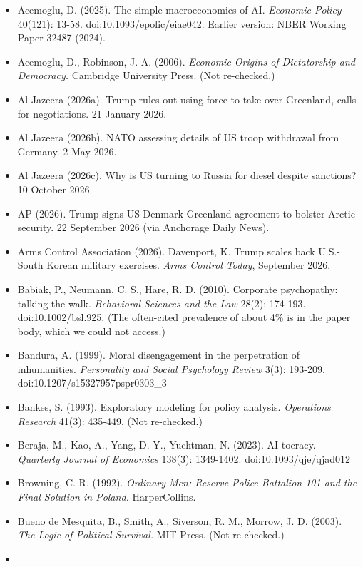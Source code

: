 \documentclass[
  10pt,
]{article}
\providecommand{\tightlist}{%
  \setlength{\itemsep}{0pt}\setlength{\parskip}{0pt}}
\begin{document}
\begin{itemize}
\tightlist
\item
  Acemoglu, D. (2025). The simple macroeconomics of AI. \emph{Economic Policy} 40(121): 13-58.
  doi:10.1093/epolic/eiae042. Earlier version: NBER Working Paper 32487 (2024).
\item
  Acemoglu, D., Robinson, J. A. (2006). \emph{Economic Origins of Dictatorship and Democracy.}
  Cambridge University Press. (Not re-checked.)
\item
  Al Jazeera (2026a). Trump rules out using force to take over Greenland, calls for negotiations. 21
  January 2026.
\item
  Al Jazeera (2026b). NATO assessing details of US troop withdrawal from Germany. 2 May 2026.
\item
  Al Jazeera (2026c). Why is US turning to Russia for diesel despite sanctions? 10 October 2026.
\item
  AP (2026). Trump signs US-Denmark-Greenland agreement to bolster Arctic security. 22 September
  2026 (via Anchorage Daily News).
\item
  Arms Control Association (2026). Davenport, K. Trump scales back U.S.-South Korean military
  exercises. \emph{Arms Control Today}, September 2026.
\item
  Babiak, P., Neumann, C. S., Hare, R. D. (2010). Corporate psychopathy: talking the walk.
  \emph{Behavioral Sciences and the Law} 28(2): 174-193. doi:10.1002/bsl.925. (The often-cited
  prevalence of about 4\% is in the paper body, which we could not access.)
\item
  Bandura, A. (1999). Moral disengagement in the perpetration of inhumanities. \emph{Personality and
  Social Psychology Review} 3(3): 193-209. doi:10.1207/s15327957pspr0303\_3
\item
  Bankes, S. (1993). Exploratory modeling for policy analysis. \emph{Operations Research} 41(3):
  435-449. (Not re-checked.)
\item
  Beraja, M., Kao, A., Yang, D. Y., Yuchtman, N. (2023). AI-tocracy. \emph{Quarterly Journal of
  Economics} 138(3): 1349-1402. doi:10.1093/qje/qjad012
\item
  Browning, C. R. (1992). \emph{Ordinary Men: Reserve Police Battalion 101 and the Final Solution in
  Poland.} HarperCollins.
\item
  Bueno de Mesquita, B., Smith, A., Siverson, R. M., Morrow, J. D. (2003). \emph{The Logic of
  Political Survival.} MIT Press. (Not re-checked.)
\item

\end{itemize}
\end{document}
